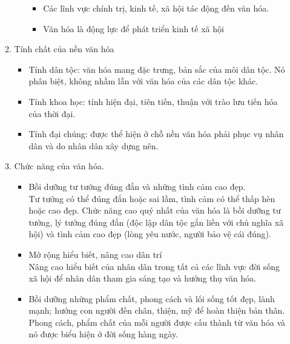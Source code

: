 \documentclass{article}
\begin{document}
\begin{enumerate}
\begin{enumerate}
\begin{itemize}
				\begin{itemize}
					\item Các lĩnh vực chính trị, kinh tế, xã hội tác động đến văn hóa.
					\item Văn hóa là động lực để phát triển kinh tế xã hội
				\end{itemize}
			\end{itemize}
			\item Tính chất của nền văn hóa 
			\begin{itemize}
				\item Tính dân tộc: văn hóa mang đặc trưng, bản sắc của môi dân tộc. Nó phân biệt, không nhầm lẫn với văn hóa của các dân tộc khác.
				\item Tính khoa học: tính hiện đại, tiên tiến, thuận với trào lưu tiến hóa của thời đại.
				\item Tính đại chúng: được thể hiện ở chỗ nền văn hóa phải phục vụ nhân dân và do nhân dân xây dựng nên.
			\end{itemize}
			\item Chức năng của văn hóa.
			\begin{itemize}
				\item Bồi dưỡng tư tưởng đúng đắn và những tình cảm cao đẹp.\\
				Tư tưởng có thể đúng đắn hoặc sai lầm, tình cảm có thể thấp hèn hoặc cao đẹp. Chức năng cao quý nhất của văn hóa là bồi dưỡng tư tưởng, lý tưởng đúng đắn (độc lập dân tộc gắn liền với chủ nghĩa xã hội) và tình cảm cao đẹp (lòng yêu nước, người bảo vệ cái đúng).
				\item Mở rộng hiểu biết, nâng cao dân trí\\
				Nâng cao hiểu biết của nhân dân trong tất cả các lĩnh vực đời sống xã hội để nhân dân tham gia sáng tạo và hưởng thụ văn hóa.
				\item Bồi dưỡng những phẩm chất, phong cách và lối sống tốt đẹp, lành mạnh; hướng con người đến chân, thiện, mỹ để hoàn thiện bản thân. Phong cách, phẩm chất của mỗi người được cấu thành từ văn hóa và nó được biểu hiện ở đời sống hàng ngày.
			\end{itemize}
		\end{enumerate}
	\end{enumerate}
\end{document}
